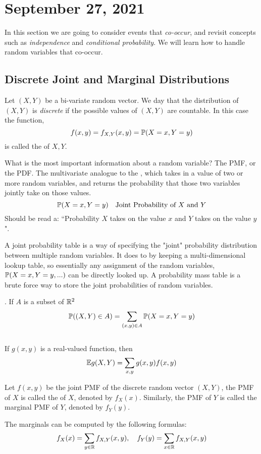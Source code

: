 \section{September 27, 2021}
In this section we are going to consider events that \textit{co-occur}, and revisit concepts such as \textit{independence} and \textit{conditional probability}. We will learn how to handle random variables that co-occur.
\subsection{Discrete Joint and Marginal Distributions}

\begin{definition}
    Let $(X,Y)$ be a bi-variate random vector. We day that the distribution of $(X,Y)$ is \textit{discrete} if the possible values of $(X,Y)$ are countable. In this case the function,
    $$
    f(x,y) = f_{X,Y}(x,y) = \mathbb P(X=x,Y=y)
    $$
 is called the  of $X,Y$.
\end{definition}

What is the most important information about a random variable? The PMF, or the PDF. The multivariate analogue to the , which takes in a value of two or more random variables, and returns the probability that those two variables jointly take on those values.
$$
\mathbb P(X =x, Y=y) \quad \text{Joint Probability of $X$ and $Y$}
$$
Should be read a: ``Probability $X$ takes on the value $x$ and $Y$ takes on the value $y$".

 A joint probability table is a way of specifying the "joint" probability distribution between multiple random variables. It does to by keeping a multi-dimensional lookup table, so essentially any assignment of the random variables, $\mathbb P(X=x,Y=y,...)$ can be directly looked up. A probability mass table is a brute force way to store the joint probabilities of random variables. 
 
 \begin{note}
    . If $A$ is a subset of $\mathbb R^2$
    $$
    \mathbb P((X,Y) \in A) = \sum_{(x,y) \in A}\mathbb P(X=x,Y=y)
    $$
    \\
     If $g(x,y)$ is a real-valued function, then
    $$
    \mathbb E g(X,Y) = \sum_{x,y} g(x,y)f(x,y)
    $$
 \end{note}

\begin{definition} 
    Let $f(x,y)$ be the joint PMF of the discrete random vector $(X,Y)$, the PMF of $X$ is called the  of $X$, denoted by $f_X(x)$. Similarly,  the PMF of $Y$ is called the marginal PMF of $Y$, denoted by $f_Y(y)$.
\end{definition}
The marginals can be computed by the following formulas:
$$
f_X(x) = \sum_{y \in \mathbb R} f_{X,Y}(x,y), \quad  f_Y(y) = \sum_{x \in \mathbb R} f_{X,Y}(x,y)
$$

